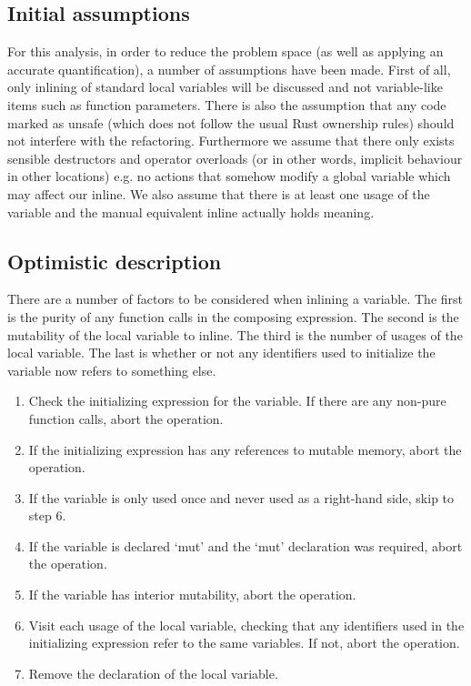 \subsection{Initial assumptions}
For this analysis, in order to reduce the problem space (as well as applying an accurate quantification), a number of assumptions have been made. First of all, only inlining of standard local variables will be discussed and not variable-like items such as function parameters. There is also the assumption that any code marked as unsafe (which does not follow the usual Rust ownership rules) should not interfere with the refactoring. Furthermore we assume that there only exists sensible destructors and operator overloads (or in other words, implicit behaviour in other locations) e.g. no actions that somehow modify a global variable which may affect our inline. We also assume that there is at least one usage of the variable and the manual equivalent inline actually holds meaning.

\subsection{Optimistic description}
There are a number of factors to be considered when inlining a variable. The first is the purity of any function calls in the composing expression. The second is the mutability of the local variable to inline. The third is the number of usages of the local variable. The last is whether or not any identifiers used to initialize the variable now refers to something else.

\begin{enumerate} 
\item Check the initializing expression for the variable. If there are any non-pure function calls, abort the operation.
\item If the initializing expression has any references to mutable memory, abort the operation.
\item If the variable is only used once and never used as a right-hand side, skip to step 6.
\item If the variable is declared `mut' and the `mut' declaration was required, abort the operation.
\item If the variable has interior mutability, abort the operation.
\item Visit each usage of the local variable, checking that any identifiers used in the initializing expression refer to the same variables. If not, abort the operation.
\item Remove the declaration of the local variable.
\end{enumerate}

